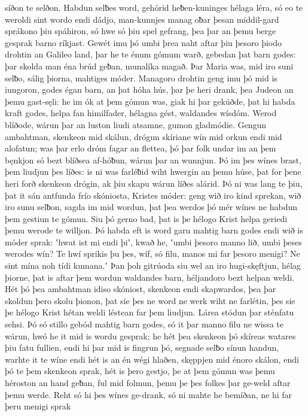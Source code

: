 síðon te selðon. Habdun selƀes word,
gehórid heƀen-kuninges hélaga léra,
só eo te weroldi sint wordo endi dádjo,
man-kunnjes manag oƀar þesan middil-gard
sprákono þiu spáhiron, só hwe só þiu spel gefrang,
þea þar an þemu berge gesprak barno ríkjast.
Gewét imu þó umbi þrea naht aftar þiu þesoro þiodo drohtin
an Galileo land, þar he te énum gómum warð,
gebedan þat barn godes: þar skolda man éna brúd geƀan,
munalíka magað. Þar Maria was,
mid iro suni selƀo, sálig þiorna,
mahtiges móder. Managoro drohtin
geng imu þó mid is iungoron, godes égan barn,
an þat hóha hús, þar þe heri drank,
þea Judeon an þemu gast-sęli: he im ók at þem gómun was,
giak hi þar gekúðde, þat hi habda kraft godes,
helpa fan himilfader, hélagna gést,
waldandes wísdóm. Werod blíðode,
wárun þar an luston liudi atsamne,
gumon gladmódie. Gengun ambahtman,
skenkeon mid skálun, drógun skíriane wín
mid orkun endi mid alofatun; was þar erlo dróm
fagar an flettea, þó þar folk undar im
an þem bęnkjon só bezt blíðsea af-hóƀun,
wárun þar an wunnjun. Þó im þes wínes brast,
þem liudjun þes líðes: is ni was farléƀid wiht
hwergin an þemu húse, þat for þene heri forð
skenkeon drógin, ak þiu skapu wárun
líðes alárid. Þó ni was lang te þiu,
þat it sán antfunda frío skóniosta,
Kristes móder: geng wið iro kind sprekan,
wið iro sunu selƀon, sagda im mid wordun,
þat þea werdos þó mér wínes ne habdun
þem gestiun te gómun. Siu þó gerno bad,
þat is þe hélogo Krist helpa geriedi
þemu werode te willjon. Þó habda eft is word garu
mahtig barn godes endi wið is móder sprak:
ʽhwat ist mi endi þiʼ, kwað he, ʽumbi þesoro manno lið,
umbi þeses werodes wín? Te hwí sprikis þu þes, wíf, só filu,
manos mi far þesoro menigi? Ne sint mína noh
tídi kumana.ʼ Þan þoh gitrúoda siu wel
an iro hugi-skęftjun, hélag þiorne,
þat is aftar þem wordun waldandes barn,
héljandoro bezt helpan weldi.
Hét þó þea ambahtman idiso skóniost,
skenkeon endi skapwardos, þea þar skoldun þero skolu þionon,
þat sie þes ne word ne werk wiht ne farlétin,
þes sie þe hélogo Krist hétan weldi
léstean far þem liudjun. Lárea stódun þar
sténfatu sehsi. Þó só stillo gebód
mahtig barn godes, só it þar manno filu
ne wissa te wárun, hwó he it mid is wordu gesprak;
he hét þea skenkeon þó skíreas watares
þiu fatu fullien, endi hi þar mid is fingrun þó,
segnade selƀo sínun handun,
warhte it te wíne endi hét is an én wégi hlaðen,
skęppjen mid énoro skálon, endi þó te þem skenkeon sprak,
hét is þero gestjo, þe at þem gómun was
þemu héroston an hand geƀan,
ful mid folmun, þemu þe þes folkes þar
ge-weld aftar þemu werde. Reht só hi þes wínes ge-drank,
só ni mahte he bemíðan, ne hi far þeru menigi sprak
